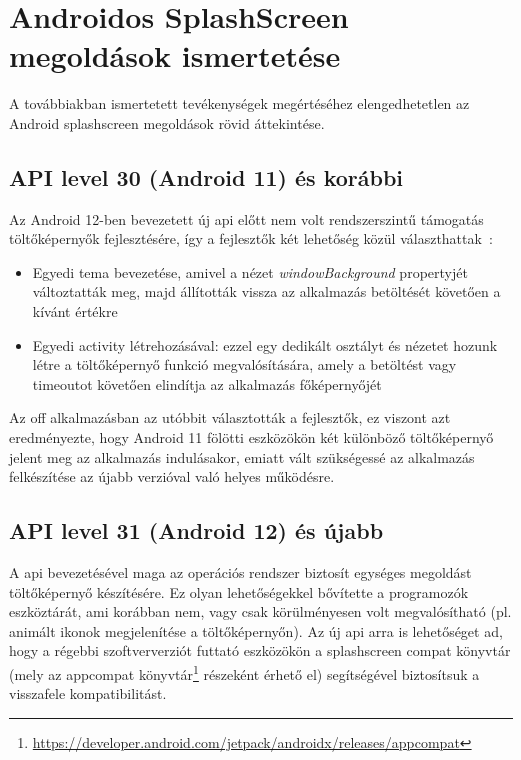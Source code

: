 \chapter{Androidos SplashScreen megoldások ismertetése}

A továbbiakban ismertetett tevékenységek megértéséhez elengedhetetlen
az Android \gls{splashscreen} megoldások rövid áttekintése.

\section{API level 30 (Android 11) és korábbi}
Az Android 12-ben bevezetett új \acrshort{api} előtt nem volt rendszerszintű támogatás töltőképernyők
fejlesztésére, így a fejlesztők két lehetőség közül választhattak~\cite{splashscreenmigration}:
\begin{itemize}
 \item Egyedi \gls{tema} bevezetése, amivel a nézet \textit{windowBackground} propertyjét változtatták meg,
 majd állították vissza az alkalmazás betöltését követően a kívánt értékre
 \item Egyedi \Gls{activity} létrehozásával: ezzel egy dedikált osztályt és nézetet hozunk létre
 a töltőképernyő funkció megvalósítására, amely a betöltést vagy timeoutot követően elindítja
 az alkalmazás főképernyőjét %
\end{itemize}


Az \acrlong{off} alkalmazásban az utóbbit választották a fejlesztők, ez viszont azt eredményezte,
hogy Android 11 fölötti eszközökön két különböző töltőképernyő jelent meg az alkalmazás indulásakor,
emiatt vált szükségessé az alkalmazás felkészítése az újabb verzióval való helyes működésre.

\section{API level 31 (Android 12) és újabb}
A  \acrshort{api} bevezetésével maga az operációs rendszer biztosít egységes megoldást
töltőképernyő készítésére. Ez olyan lehetőségekkel bővítette a programozók eszköztárát, ami korábban
nem, vagy csak körülményesen volt megvalósítható (pl. animált ikonok megjelenítése
a töltőképernyőn).
Az új \acrshort{api} arra is lehetőséget ad, hogy a régebbi szoftververziót futtató eszközökön a \gls{splashscreen}
compat könyvtár (mely az \gls{appcompat} könyvtár\footnote{\url{https://developer.android.com/jetpack/androidx/releases/appcompat}} részeként érhető el)
segítségével biztosítsuk a visszafele kompatibilitást.
